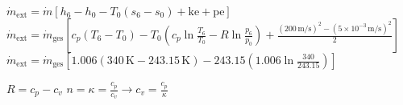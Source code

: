 \( \dot{m}_{\text{ext}} = \dot{m} \left[ h_6 - h_0 - T_0 (s_6 - s_0) + \text{ke} + \text{pe} \right] \)  
\( \dot{m}_{\text{ext}} = \dot{m}_{\text{ges}} \left[ c_p (T_6 - T_0) - T_0 \left( c_p \ln \frac{T_6}{T_0} - R \ln \frac{p_6}{p_0} \right) + \frac{(200 \, \text{m/s})^2 - (5 \times 10^{-3} \, \text{m/s})^2}{2} \right] \)  
\( \dot{m}_{\text{ext}} = \dot{m}_{\text{ges}} \left[ 1.006 (340 \, \text{K} - 243.15 \, \text{K}) - 243.15 \left( 1.006 \ln \frac{340}{243.15} \right) \right] \)  

\( R = c_p - c_v \)  
\( n = \kappa = \frac{c_p}{c_v} \rightarrow c_v = \frac{c_p}{\kappa} \)